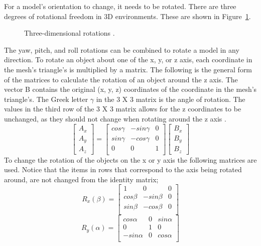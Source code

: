 For a model's orientation to change, it needs to be rotated. There are three degrees of rotational freedom in 3D environments. These are shown in Figure~\ref{fig:rotaion}. 
\begin{figure}[!ht]
	\begin{center}
	\end{center}
	\caption{Three-dimensional rotations \cite{LaValle2017}.} \label{fig:rotaion}
\end{figure}The yaw, pitch, and roll rotations can be combined to rotate a model in any direction. To rotate an object about one of the x, y, or z axis, each coordinate in the mesh's triangle's is multiplied by a matrix. The following is the general form of the matrices to calculate the rotation of an object around the z axis. The vector B contains the original (x, y, z) coordinates of the coordinate in the mesh's triangle's. The Greek letter $\gamma$ in the 3 X 3 matrix is the angle of rotation. The values in the third row of the 3 X 3 matrix allows for the z coordinates to be unchanged, as they should not change when rotating around the z axis \cite{LaValle2017}.
\[
\begin{bmatrix}
	A_{x} \\
	A_{y} \\
	A_{z} 
\end{bmatrix}
=
\begin{bmatrix}
	cos \gamma & -sin \gamma & 0  \\
	sin \gamma & -cos \gamma & 0  \\
	0 & 0 & 1 \\
\end{bmatrix}
\begin{bmatrix}
	B_{x} \\
	B_{y} \\
	B_{z} 
\end{bmatrix}
\]
To change the rotation of the objects on the x or y axis the following matrices are used. Notice that the items in rows that correspond to the axis being rotated around, are not changed from the identity matrix;
\[
R_{x}(\beta) = 
\begin{bmatrix}
1 & 0 & 0 \\
cos \beta & -sin \beta & 0  \\
sin \beta & -cos \beta & 0  \\
\end{bmatrix}
\]
\[
R_{y}(\alpha) = 
\begin{bmatrix}
cos \alpha &  0 & sin \alpha  \\
0 & 1 & 0 \\
-sin \alpha & 0 & cos \alpha \\
\end{bmatrix}
\]


